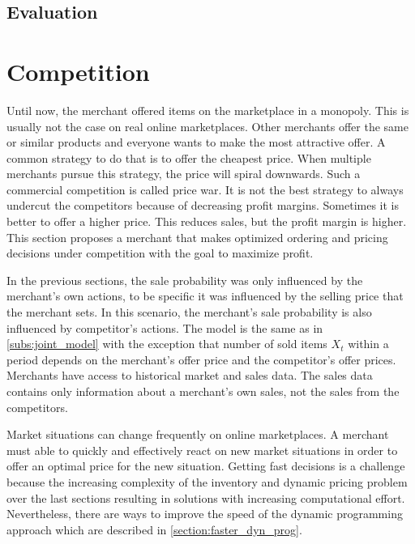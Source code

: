 \subsection{Evaluation}




\section{Competition}
Until now, the merchant offered items on the marketplace in a monopoly.
This is usually not the case on real online marketplaces.
Other merchants offer the same or similar products and everyone wants to make the most attractive offer.
A common strategy to do that is to offer the cheapest price.
When multiple merchants pursue this strategy, the price will spiral downwards.
Such a commercial competition is called price war.
It is not the best strategy to always undercut the competitors because of decreasing profit margins.
Sometimes it is better to offer a higher price.
This reduces sales, but the profit margin is higher.
This section proposes a merchant that makes optimized ordering and pricing decisions under competition with the goal to maximize profit.

In the previous sections, the sale probability was only influenced by the merchant's own actions, to be specific it was influenced by the selling price that the merchant sets.
In this scenario, the merchant's sale probability is also influenced by competitor's actions.
The model is the same as in \cref{subs:joint_model} with the exception that number of sold items $X_t$ within a period depends on the merchant's offer price and the competitor's offer prices.
Merchants have access to historical market and sales data.
The sales data contains only information about a merchant's own sales, not the sales from the competitors.

Market situations can change frequently on online marketplaces.
A merchant must able to quickly and effectively react on new market situations in order to offer an optimal price for the new situation.
Getting fast decisions is a challenge because the increasing complexity of the inventory and dynamic pricing problem over the last sections resulting in solutions with increasing computational effort.
Nevertheless, there are ways to improve the speed of the dynamic programming approach which are described in \cref{section:faster_dyn_prog}.

